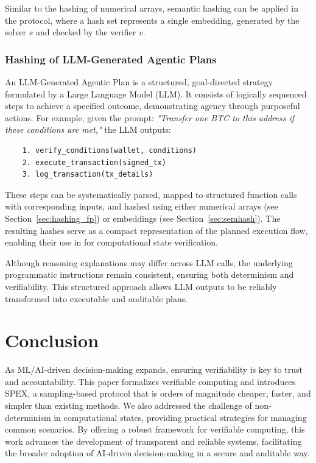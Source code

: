 \documentclass[sigconf, nonacm]{acmart}
\begin{document}
Similar to the hashing of numerical arrays, semantic hashing can be applied in the  protocol, where a hash set represents a single embedding, generated by the solver $s$ and checked by the verifier $v$.

\subsubsection{Hashing of LLM-Generated Agentic Plans}
\label{sec:hashagent}

An LLM-Generated Agentic Plan is a structured, goal-directed strategy formulated by a Large Language Model (LLM). It consists of logically sequenced steps to achieve a specified outcome, demonstrating agency through purposeful actions.
For example, given the prompt: \textit{"Transfer one BTC to this address if these conditions are met,"} the LLM outputs:
\vspace*{.1cm}
\begin{small}
  \begin{verbatim}
    1. verify_conditions(wallet, conditions)
    2. execute_transaction(signed_tx)
    3. log_transaction(tx_details)    
\end{verbatim}
\end{small}

These steps can be systematically parsed, mapped to structured function calls with corresponding inputs, and hashed using either numerical arrays (see Section~\ref{sec:hashing_fp}) or embeddings (see Section~\ref{sec:semhash}). The resulting hashes serve as a compact representation of the planned execution flow, enabling their use in  for computational state verification.

Although reasoning explanations may differ across LLM calls, the underlying programmatic instructions remain consistent, ensuring both determinism and verifiability. This structured approach allows LLM outputs to be reliably transformed into executable and auditable plans.


\section{Conclusion}
\label{sec:conclusion}

As ML/AI-driven decision-making expands, ensuring verifiability is key to trust and accountability. This paper formalizes verifiable computing and introduces SPEX, a sampling-based protocol that is orders of magnitude cheaper, faster, and simpler than existing methods.
We also addressed the challenge of non-determinism in computational states, providing practical strategies for managing common scenarios. By offering a robust framework for verifiable computing, this work advances the development of transparent and reliable systems, facilitating the broader adoption of AI-driven decision-making in a secure and auditable way.



\end{document}

